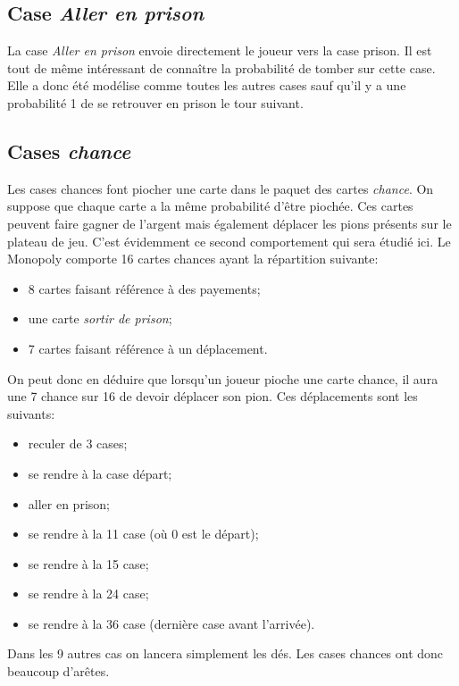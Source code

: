 \documentclass[letterpaper]{article}
\begin{document}
  \subsection{Case \textit{Aller en prison}}
    \label{aller_en_prison}
    La case \textit{Aller en prison} envoie directement le joueur vers
    la case prison.  Il est tout de même intéressant de connaître la
    probabilité de tomber sur cette case.  Elle a donc été modélise
    comme toutes les autres cases sauf qu'il y a une probabilité 1
    de se retrouver en prison le tour suivant.
    
  \subsection{Cases \textit{chance}}
    Les cases chances font piocher une carte dans le paquet des
    cartes \textit{chance}.  On suppose que chaque carte a la 
    même probabilité d'être piochée. Ces cartes peuvent faire gagner de 
    l'argent mais également déplacer les pions présents sur le plateau 
    de jeu.  C'est évidemment ce second comportement qui sera étudié 
    ici.  Le Monopoly comporte 16 cartes chances ayant la répartition 
    suivante:
    \begin{itemize}
     \item 8 cartes faisant référence à des payements;
     \item une carte \textit{sortir de prison};
     \item 7 cartes faisant référence à un déplacement.
    \end{itemize}
    On peut donc en déduire que lorsqu'un joueur pioche une carte 
    chance, il aura une 7 chance sur 16 de devoir déplacer son pion.  
    Ces déplacements sont les suivants:
    \begin{itemize}
     \item reculer de 3 cases;
     \item se rendre à la case départ;
     \item aller en prison;
     \item se rendre à la 11 case (où 0 est le départ);
     \item se rendre à la 15 case;
     \item se rendre à la 24 case;
     \item se rendre à la 36 case (dernière case avant l'arrivée).
    \end{itemize}
    Dans les 9 autres cas on lancera simplement les dés.  Les cases 
    chances ont donc beaucoup d'arêtes.
    
\end{document}
